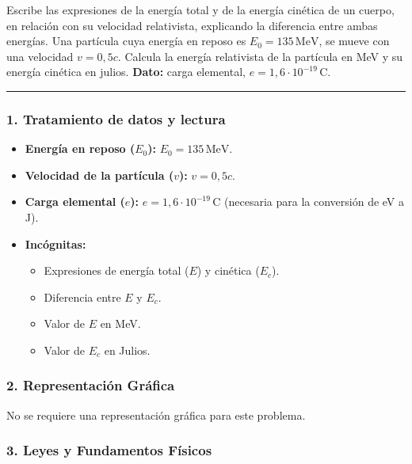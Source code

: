\begin{cajaenunciado}
Escribe las expresiones de la energía total y de la energía cinética de un cuerpo, en relación con su velocidad relativista, explicando la diferencia entre ambas energías. Una partícula cuya energía en reposo es $E_0 = 135\,\text{MeV}$, se mueve con una velocidad $v=0,5c$. Calcula la energía relativista de la partícula en MeV y su energía cinética en julios.
\textbf{Dato:} carga elemental, $e=1,6\cdot10^{-19}\,\text{C}$.
\end{cajaenunciado}
\hrule

\subsubsection*{1. Tratamiento de datos y lectura}
\begin{itemize}
    \item \textbf{Energía en reposo ($E_0$):} $E_0 = 135 \, \text{MeV}$.
    \item \textbf{Velocidad de la partícula ($v$):} $v=0,5c$.
    \item \textbf{Carga elemental ($e$):} $e = 1,6 \cdot 10^{-19} \, \text{C}$ (necesaria para la conversión de eV a J).
    \item \textbf{Incógnitas:}
    \begin{itemize}
        \item Expresiones de energía total ($E$) y cinética ($E_c$).
        \item Diferencia entre $E$ y $E_c$.
        \item Valor de $E$ en MeV.
        \item Valor de $E_c$ en Julios.
    \end{itemize}
\end{itemize}

\subsubsection*{2. Representación Gráfica}
No se requiere una representación gráfica para este problema.

\subsubsection*{3. Leyes y Fundamentos Físicos}
